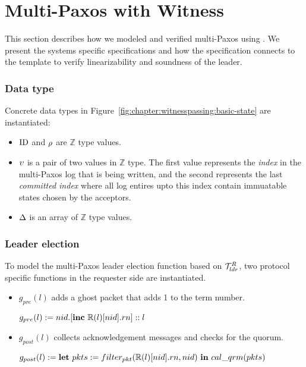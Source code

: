 
\section{Multi-Paxos with Witness}
\label{chapter:witnesspassing:sec:multipaxos-with-witness}

This section describes how we modeled and verified multi-Paxos using 
\sysname{}. We present the systems specific specifications and how the
specification connects to the template to verify linearizability and soundness
of the leader. 

\subsubsection{Data type}

Concrete data types in Figure~\ref{fig:chapter:witnesspassing:basic-state} are instantiated:
\begin{itemize}
\item $\mathrm{ID}$ and $\rho$ are $\mathbb{Z}$ type values.
\item $\upsilon$ is a pair of two values in $\mathbb{Z}$ type. The first value represents 
the \textit{index} in the multi-Paxos log that is being written, and the 
second represents the last \textit{committed index} where all log entires upto this
index contain immuatable states chosen by the acceptors.
\item $\Delta$ is an array of $\mathbb{Z}$ type values.
\end{itemize}

\subsubsection{Leader election}
To model the multi-Paxos leader election function based on $\mathcal{T}^{R}_{ldr}$,
two protocol specific functions in the requester side are instantiated.
\begin{itemize}
\item $g_{pre} (l)$ adds a ghost packet that adds 1 to the term number.
\begin{center}
$g_{pre} (l) := nid.[\mbox{\textbf{inc}} \ \replay(l)[nid].rn]::l$
\end{center}
\item $g_{post} (l)$ collects acknowledgement messages and checks for the
	quorum.
	\begin{center}
$g_{post} (l) := \mbox{\textbf{let}}\ pkts := filter_{pkt}(\replay(l)[nid].rn, nid)\ \mbox{\textbf{in}} \ cal\_qrm(pkts)$
\end{center}
\end{itemize}

